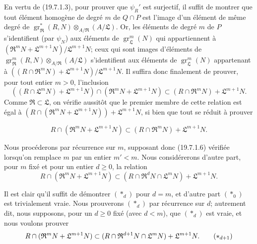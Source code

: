\begin{env}[19.7.1.5]
\label{IV.19.7.1.5}
En vertu de (19.7.1.3), pour prouver que $\psi_R'$ est surjectif, il suffit de montrer que tout élément homogène de degré $m$ de $Q\cap P$ est l'image d'un élément de même degré de $\operatorname{gr}_{\mathfrak R}^*(R,N)\otimes_{A/\mathfrak R}(A/\mathfrak L)$. Or, les éléments de degré $m$ de $P$ s'identifient (par $\psi_N$) aux éléments de $\operatorname{gr}_{\mathfrak L}^m(N)$ qui appartiennent à $(\mathfrak R^mN+\mathfrak L^{m+1}N)/\mathfrak L^{m+1}N$; ceux qui sont images d'éléments de $\operatorname{gr}_{\mathfrak R}^m(R,N)\otimes_{A/\mathfrak R}(A/\mathfrak L)$ s'identifient aux éléments de $\operatorname{gr}_{\mathfrak L}^m(N)$ appartenant à $((R\cap\mathfrak R^mN)+\mathfrak L^{m+1}N)/\mathfrak L^{m+1}N$. Il suffira donc finalement de prouver, pour tout entier $m>0$, l'inclusion
\[
  ((R\cap\mathfrak L^mN)+\mathfrak L^{m+1}N)\cap(\mathfrak R^mN+\mathfrak L^{m+1}N)\subset(R\cap\mathfrak R^mN)+\mathfrak L^{m+1}N.
\]
Comme $\mathfrak R\subset\mathfrak L$, on vérifie aussitôt que le premier membre de cette relation est égal à $(R\cap(\mathfrak R^mN+\mathfrak L^{m+1}N))+\mathfrak L^{m+1}N$, si bien que tout se réduit à prouver
\end{env}

\begin{env}[19.7.1.6]
\label{IV.19.7.1.6}
\[
  R\cap(\mathfrak R^mN+\mathfrak L^{m+1}N)\subset(R\cap\mathfrak R^mN)+\mathfrak L^{m+1}N.
\]
\end{env}


Nous procéderons par récurrence sur $m$, supposant donc (19.7.1.6) vérifiée lorsqu'on remplace $m$ par un entier $m'<m$. Nous considérerons d'autre part, pour $m$ fixé et pour un entier $d\geq0$, la relation
\begin{equation}
  R\cap(\mathfrak R^mN+\mathfrak L^{m+1}N)\subset(R\cap\mathfrak R^dN\cap\mathfrak L^mN)+\mathfrak L^{m+1}N.
  \tag{$*_d$}
\end{equation}

Il est clair qu'il suffit de démontrer $(*_d)$ pour $d=m$, et d'autre part $(*_0)$ est trivialement vraie. Nous prouverons $(*_d)$ par récurrence sur $d$; autrement dit, nous supposons, pour un $d\geq0$ fixé (avec $d<m$), que $(*_d)$ est vraie, et nous voulons prouver
\begin{equation}
  R\cap(\mathfrak R^mN+\mathfrak L^{m+1}N)\subset(R\cap\mathfrak R^{d+1}N\cap\mathfrak L^mN)+\mathfrak L^{m+1}N.
  \tag{$*_{d+1}$}
\end{equation}

